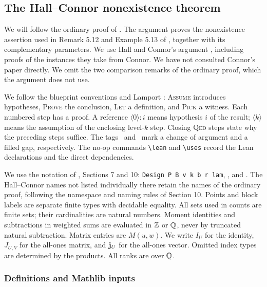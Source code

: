\subsection{The Hall--Connor nonexistence theorem}\label{hc:sec:main}
\begin{mergedproofsection}
\raggedbottom

We will follow the ordinary proof of
. The argument proves the
nonexistence assertion used in Remark 5.12 and Example 5.13 of
\cite{CGSS}, together with its complementary parameters. We use
Hall and Connor's argument \cite{HC}, including proofs of the instances
they take from Connor. We have not consulted Connor's paper directly.
We omit the two comparison remarks of the ordinary proof, which the
argument does not use.

We follow the blueprint conventions and Lamport \cite{L95}:
\textsc{Assume} introduces hypotheses, \textsc{Prove} the conclusion,
\textsc{Let} a definition, and \textsc{Pick} a witness.
Each numbered step has a proof. A reference $\langle0\rangle{:}i$
means hypothesis $i$ of the result; $\langle k\rangle$ means the
assumption of the enclosing level-$k$ step. Closing \textsc{Qed}
steps state why the preceding steps suffice. The tags \new\ and
\repair\ mark a change of argument and a filled gap, respectively.
The no-op commands \verb|\lean| and \verb|\uses| record the Lean
declarations and the direct dependencies.

We use the notation of , Sections 7 and 10:
\texttt{Design P B v k b r lam}, , and .
The Hall--Connor names not listed individually there retain the names
of the ordinary proof, following the namespace and
naming rules of Section 10. Points and block labels are separate finite
types with decidable equality. All sets used in counts are finite sets;
their cardinalities are natural numbers. Moment identities and
subtractions in weighted sums are evaluated in ${\mathbb Z}$ or ${\mathbb Q}$,
never by truncated natural subtraction. Matrix entries are $M(u,w)$.
We write $I_U$ for the identity, $J_{U,V}$ for the all-ones matrix,
and ${\mathbf j}_U$ for the all-ones vector. Omitted index types are determined
by the products. All ranks are over ${\mathbb Q}$.

\subsubsection{Definitions and Mathlib inputs}


\end{mergedproofsection}
